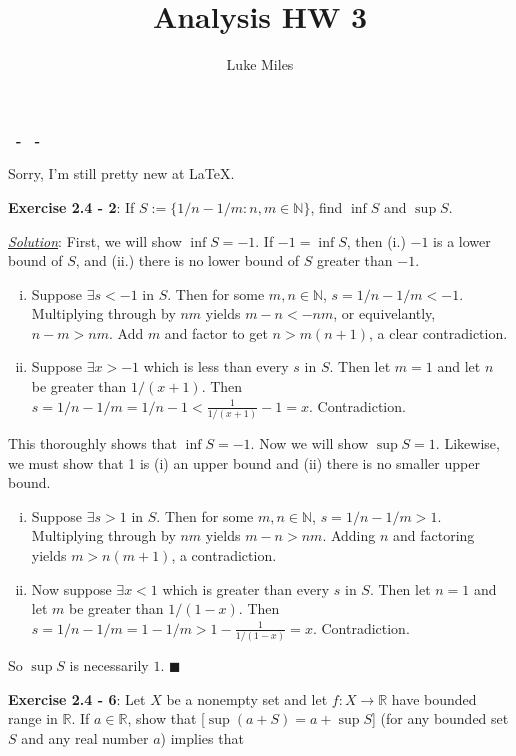 \documentclass{article}
\title{Analysis HW 3}
\author{Luke Miles}
\begin{document}
\makeatletter
\textbf{\@title\ - \@author\ - \@date}
\makeatother

\hrulefill

Sorry, I'm still pretty new at \LaTeX.

\textbf{Exercise 2.4 - 2}: If $S:=\{1/n - 1/m : n, m \in \mathbb{N}\}$,
find $\inf S$ and $\sup S$.

\underline{\textit{Solution}}: First, we will show $\inf S = -1$.
If $-1 = \inf S$, then (i.) $-1$ is a lower bound of $S$,
and (ii.) there is no lower bound of $S$ greater than $-1$.  

\begin{enumerate}[(i)]
\item Suppose $\exists s < -1$ in $S$.
Then for some $m, n \in \mathbb{N}$, $s = 1/n - 1/m < -1$.
Multiplying through by $nm$ yields $m - n < -nm$,
or equivelantly, $n - m > nm$.
Add $m$ and factor to get $n > m (n + 1)$, a clear contradiction.

\item Suppose $\exists x > -1$ which is less than every $s$ in $S$. Then
let $m = 1$ and let $n$ be greater than $1/(x+1)$.
Then $s = 1/n - 1/m = 1/n - 1 < \frac{1}{1/(x+1)} - 1 = x$. Contradiction.
\end{enumerate}

This thoroughly shows that $\inf S = -1$. Now we will show $\sup S = 1$.
Likewise, we must show that 1 is (i) an upper bound and (ii) there is no
smaller upper bound.

\begin{enumerate}[(i)]
\item Suppose $\exists s > 1$ in $S$. Then for some $m, n \in \mathbb{N}$,
$s = 1/n - 1/m > 1$. Multiplying through by $nm$ yields $m - n > nm$.
Adding $n$ and factoring yields $m > n (m + 1)$, a contradiction.

\item Now suppose $\exists x < 1$ which is greater than every $s$ in $S$.
Then let $n = 1$ and let $m$ be greater than $1/(1-x)$.
Then $s = 1/n - 1/m = 1 - 1/m > 1 - \frac{1}{1/(1-x)} = x$. Contradiction.
\end{enumerate}

So $\sup S$ is necessarily $1$. $\blacksquare$

\hrulefill

\textbf{Exercise 2.4 - 6}: Let $X$ be a nonempty set and let $f: X
\rightarrow \mathbb{R}$ have bounded range in $\mathbb{R}$. If $a \in
\mathbb{R}$, show that [$\sup (a + S) = a + \sup S$] (for any bounded set
$S$ and any real number $a$) implies that
\end{document}

